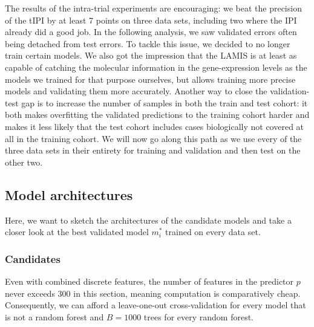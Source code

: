 The results of the intra-trial experiments are encouraging: we beat the precision of the tIPI by 
at least \num{7} points on three data sets, including two where the IPI already did a good job. 
In the following analysis, we saw validated errors often being detached from test errors. To tackle 
this issue, we decided to no longer train certain models. We also got the impression that the LAMIS 
is at least as capable of catching the molecular information in the gene-expression levels as the models
we trained for that purpose ourselves, but allows training more precise models and validating them 
more accurately. Another way to close the validation-test gap is to increase the number of samples 
in both the train and test cohort: it both makes overfitting the validated predictions to the 
training cohort harder and makes it less likely that the test cohort includes cases biologically 
not covered at all in the training cohort. We will now go along this path as we use every of the 
three data sets in their entirety for training and validation and then test on the other two.

\subsection{Model architectures}

Here, we want to sketch the architectures of the candidate models and take a closer look at the 
best validated model $m_i^*$ trained on every data set.

\subsubsection{Candidates}

Even with combined discrete features, the number of features in the predictor $p$ 
never exceeds \num{300} in this section, meaning computation is comparatively cheap. 
Consequently, we can afford 
a leave-one-out cross-validation for every model that is not a random forest and $B = \num{1000}$ 
trees for every random forest.

